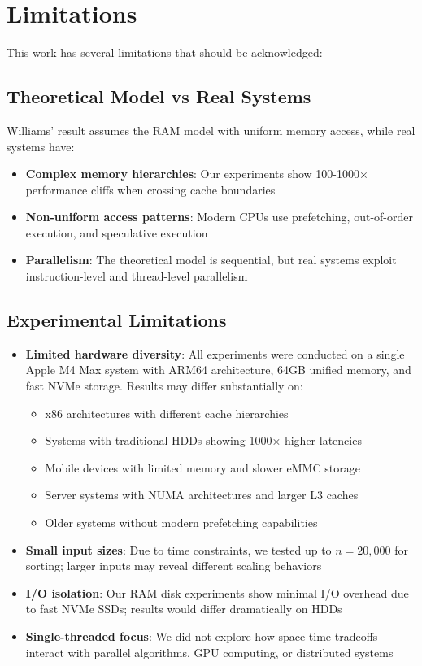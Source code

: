\documentclass[11pt]{article}
\theoremstyle{definition}
\begin{document}
\section{Limitations}

This work has several limitations that should be acknowledged:

\subsection{Theoretical Model vs Real Systems}

Williams' result assumes the RAM model with uniform memory access, while real systems have:
\begin{itemize}
\item \textbf{Complex memory hierarchies}: Our experiments show 100-1000× performance cliffs when crossing cache boundaries
\item \textbf{Non-uniform access patterns}: Modern CPUs use prefetching, out-of-order execution, and speculative execution
\item \textbf{Parallelism}: The theoretical model is sequential, but real systems exploit instruction-level and thread-level parallelism
\end{itemize}

\subsection{Experimental Limitations}

\begin{itemize}
\item \textbf{Limited hardware diversity}: All experiments were conducted on a single Apple M4 Max system with ARM64 architecture, 64GB unified memory, and fast NVMe storage. Results may differ substantially on:
  \begin{itemize}
  \item x86 architectures with different cache hierarchies
  \item Systems with traditional HDDs showing 1000× higher latencies
  \item Mobile devices with limited memory and slower eMMC storage
  \item Server systems with NUMA architectures and larger L3 caches
  \item Older systems without modern prefetching capabilities
  \end{itemize}
\item \textbf{Small input sizes}: Due to time constraints, we tested up to $n = 20,000$ for sorting; larger inputs may reveal different scaling behaviors
\item \textbf{I/O isolation}: Our RAM disk experiments show minimal I/O overhead due to fast NVMe SSDs; results would differ dramatically on HDDs
\item \textbf{Single-threaded focus}: We did not explore how space-time tradeoffs interact with parallel algorithms, GPU computing, or distributed systems
\end{itemize}
\end{document}
